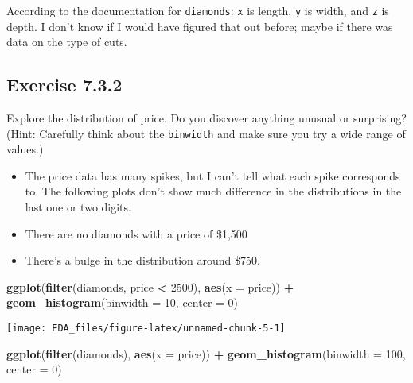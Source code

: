 \documentclass[]{book}
\newenvironment{Shaded}{\begin{snugshade}}{\end{snugshade}}
\newcommand{\DataTypeTok}[1]{\textcolor[rgb]{0.13,0.29,0.53}{#1}}
\newcommand{\DecValTok}[1]{\textcolor[rgb]{0.00,0.00,0.81}{#1}}
\newcommand{\KeywordTok}[1]{\textcolor[rgb]{0.13,0.29,0.53}{\textbf{#1}}}
\newcommand{\NormalTok}[1]{#1}
\newcommand{\OperatorTok}[1]{\textcolor[rgb]{0.81,0.36,0.00}{\textbf{#1}}}
\newcommand{\StringTok}[1]{\textcolor[rgb]{0.31,0.60,0.02}{#1}}
\providecommand{\tightlist}{%
  \setlength{\itemsep}{0pt}\setlength{\parskip}{0pt}}
\theoremstyle{plain}
\theoremstyle{remark}
\theoremstyle{definition}
\theoremstyle{definition}
\theoremstyle{definition}
\theoremstyle{remark}
\begin{document}
According to the documentation for \texttt{diamonds}: \texttt{x} is
length, \texttt{y} is width, and \texttt{z} is depth. I don't know if I
would have figured that out before; maybe if there was data on the type
of cuts.

\hypertarget{exercise-7.3.2}{%
\subsection*{\texorpdfstring{Exercise
{7.3.2}}{Exercise 7.3.2}}\label{exercise-7.3.2}}

Explore the distribution of price. Do you discover anything unusual or
surprising? (Hint: Carefully think about the \texttt{binwidth} and make
sure you try a wide range of values.)

\begin{itemize}
\tightlist
\item
  The price data has many spikes, but I can't tell what each spike
  corresponds to. The following plots don't show much difference in the
  distributions in the last one or two digits.
\item
  There are no diamonds with a price of \$1,500
\item
  There's a bulge in the distribution around \$750.
\end{itemize}

\begin{Shaded}
\begin{Highlighting}[]
\KeywordTok{ggplot}\NormalTok{(}\KeywordTok{filter}\NormalTok{(diamonds, price }\OperatorTok{<}\StringTok{ }\DecValTok{2500}\NormalTok{), }\KeywordTok{aes}\NormalTok{(}\DataTypeTok{x =}\NormalTok{ price)) }\OperatorTok{+}
\StringTok{  }\KeywordTok{geom_histogram}\NormalTok{(}\DataTypeTok{binwidth =} \DecValTok{10}\NormalTok{, }\DataTypeTok{center =} \DecValTok{0}\NormalTok{)}
\end{Highlighting}
\end{Shaded}

\begin{center}\texttt{[image: EDA\_files/figure-latex/unnamed-chunk-5-1]} \end{center}

\begin{Shaded}
\begin{Highlighting}[]
\KeywordTok{ggplot}\NormalTok{(}\KeywordTok{filter}\NormalTok{(diamonds), }\KeywordTok{aes}\NormalTok{(}\DataTypeTok{x =}\NormalTok{ price)) }\OperatorTok{+}
\StringTok{  }\KeywordTok{geom_histogram}\NormalTok{(}\DataTypeTok{binwidth =} \DecValTok{100}\NormalTok{, }\DataTypeTok{center =} \DecValTok{0}\NormalTok{)}
\end{Highlighting}
\end{Shaded}
\end{document}
